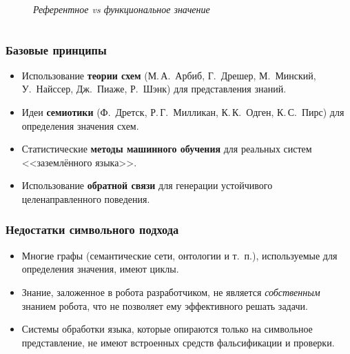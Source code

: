 \documentclass[default]{beamer}
\begin{document}
\begin{frame}
\begin{columns}
\begin{column}{0.3\textwidth}
\begin{figure}
					{
							\scriptsize
							\textit{Референтное vs функциональное значение}
					}
				\end{figure}
			\end{column}
		\end{columns}
		
	\end{frame}	

	\begin{frame}
		\frametitle{Базовые принципы}
		
		\begin{itemize}
			\item Использование \textbf{теории схем} (М.\,А.~Арбиб, Г.~Дрешер, М.~Минский, У.~Найссер, Дж.~Пиаже, Р.~Шэнк) для представления знаний.
			\item Идеи \textbf{семиотики} (Ф.~Дретск, Р.\,Г.~Милликан, К.\,К.~Одген, К.\,С.~Пирс) для определения значения схем.
			\item Статистические \textbf{методы машинного обучения} для реальных систем <<заземлённого языка>>.
			\item Использование \textbf{обратной связи} для генерации устойчивого целенаправленного поведения.
		\end{itemize}
	\end{frame}

	\begin{frame}
		\frametitle{Недостатки символьного подхода}
		
		\begin{itemize}
			\item Многие графы (семантические сети, онтологии и т.~п.), используемые для определения значения, имеют циклы.
			\item Знание, заложенное в робота разработчиком, не является \textit{собственным} знанием робота, что не позволяет ему эффективного решать задачи.
			\item Системы обработки языка, которые опираются только на символьное представление, не имеют встроенных средств фальсификации и проверки.
		\end{itemize}
	\end{frame}
\end{document}
